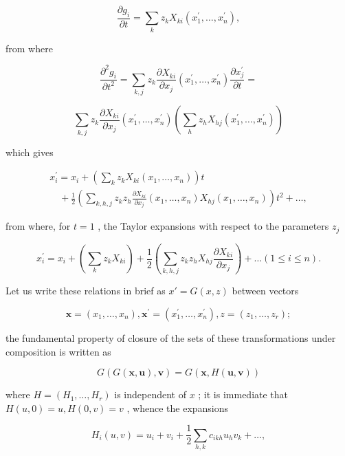 \[
\frac {\partial g _ {i}}{\partial t} = \sum_ {k} z _ {k} X _ {k i} (x _ {1} ^ {\prime}, \dots , x _ {n} ^ {\prime}),
\]

from where

\[
\frac {\partial^ {2} g _ {i}}{\partial t ^ {2}} = \sum_ {k, j} z _ {k} \frac {\partial X _ {k i}}{\partial x _ {j}} (x _ {1} ^ {\prime}, \dots , x _ {n} ^ {\prime}) \frac {\partial x _ {j} ^ {\prime}}{\partial t} =
\]

\[
\sum_ {k, j} z _ {k} \frac {\partial X _ {k i}}{\partial x _ {j}} (x _ {1} ^ {\prime}, \dots , x _ {n} ^ {\prime}) \left(\sum_ {h} z _ {h} X _ {h j} (x _ {1} ^ {\prime}, \dots , x _ {n} ^ {\prime})\right)
\]

which gives

\[
\begin{array}{l} x _ {i} ^ {\prime} = x _ {i} + \left(\sum_ {k} z _ {k} X _ {k i} (x _ {1}, \dots , x _ {n})\right) t \\ \quad + \frac {1}{2} \left(\sum_ {k, h, j} z _ {k} z _ {h} \frac {\partial X _ {k i}}{\partial x _ {j}} (x _ {1}, \dots , x _ {n}) X _ {h j} (x _ {1}, \dots , x _ {n})\right) t ^ {2} + \dots , \end{array}
\]

from where, for \(t = 1\) , the Taylor expansions with respect to the parameters \(z_{j}\)

\[
x _ {i} ^ {\prime} = x _ {i} + \left(\sum_ {k} z _ {k} X _ {k i}\right) + \frac {1}{2} \left(\sum_ {k, h, j} z _ {k} z _ {h} X _ {h j} \frac {\partial X _ {k i}}{\partial x _ {j}}\right) + \dots (1 \leq i \leq n).\tag{25.9}
\]

Let us write these relations in brief as \(x' = G(x, z)\) between vectors

\[
\boldsymbol {x} = (x _ {1}, \dots , x _ {n}), \boldsymbol {x} ^ {\prime} = (x _ {1} ^ {\prime}, \dots , x _ {n} ^ {\prime}), z = (z _ {1}, \dots , z _ {r});
\]

the fundamental property of closure of the sets of these transformations under composition is written as

\[
G (G (\boldsymbol {x}, \boldsymbol {u}), \boldsymbol {v}) = G (\boldsymbol {x}, H (\boldsymbol {u}, \boldsymbol {v}))\tag{25.10}
\]

where \(H = (H_{1},\ldots ,H_{r})\) is independent of \(x\) ; it is immediate that \(H(u,0) = u,H(0,v) = v\) , whence the expansions

\[
H _ {i} (u, v) = u _ {i} + v _ {i} + \frac {1}{2} \sum_ {h, k} c _ {i k h} u _ {h} v _ {k} + \dots ,\tag{25.11}
\]

